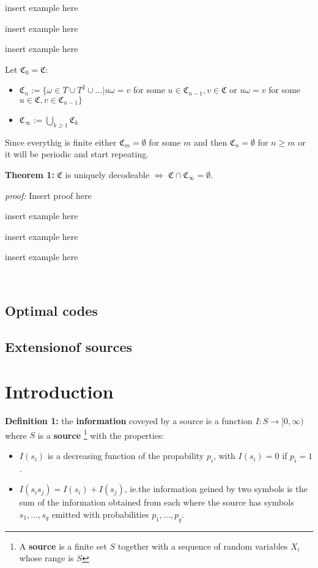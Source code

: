 \documentclass{article}
\begin{document}
insert example here

insert example here

insert example here
 
 
\noindent Let $\mathfrak{C}_0 = \mathfrak{C}$:

\begin{itemize}
	\item $\mathfrak{C}_n := \{   \omega \in T \cup T^2 \cup... | u\omega = v$ for some $u \in \mathfrak{C}_{n-1}, v \in \mathfrak{C}$ or $ u\omega = v$ for some $u \in \mathfrak{C}, v \in \mathfrak{C}_{n-1}   \}$
	\item $\mathfrak{C}_{\infty} := \bigcup_{k \geq 1} \mathfrak{C}_k$
\end{itemize}

Since everythig is finite either $\mathfrak{C}_m = \emptyset$ for some $m$ and then $\mathfrak{C}_n = \emptyset$ for $n\geq m$ or it will be periodic and start repeating.


\noindent\textbf{Theorem 	1:} $\mathfrak{C}$ is uniquely decodeable $\Longleftrightarrow$ $\mathfrak{C} \cap \mathfrak{C}_{\infty} = \emptyset$.

 \noindent\textit{proof:}  Insert proof here

insert example here

insert example here

insert example here

\
		\subsection{Optimal codes}
		
		
		\subsection{Extensionof sources}
		


		
\newpage
		\section{Introduction}

\noindent\textbf{Definition 	1:} the \textbf{information} coveyed by a source is a function $I:S  \rightarrow [ 0, \infty ) $ where $S$ is a \textbf{source} \footnote{A \textbf{source} is a finite set $S$ together with a sequence of random variables $X_i$ whose range is $S$} with the properties:
		
		\begin{itemize}
			\item $I(s_i)$ is a decreasing function of the propability $p_i$, with $I(s_i) = 0$ if $p_i = 1$.
			\item $I(s_i s_j) = I(s_i) + I(s_j)$, ie.the information geined by two symbols is the sum of the information obtained from each where the source has symbols $s_1, ..., s_q$ emitted with probabilities $p_1, ..., p_q$.
		\end{itemize}
		
\end{document}
